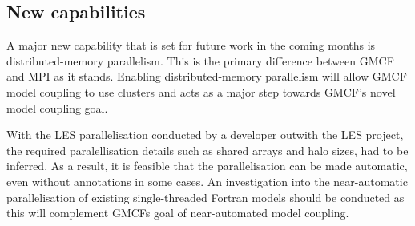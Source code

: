 \subsection{New capabilities}

A major new capability that is set for future work in the coming months is
distributed-memory parallelism. This is the primary difference between GMCF and
MPI as it stands. Enabling distributed-memory parallelism will allow GMCF model
coupling to use clusters and acts as a major step towards GMCF's novel model
coupling goal.

With the LES parallelisation conducted by a developer outwith the LES project,
the required paralellisation details such as shared arrays and halo sizes, had
to be inferred. As a result, it is feasible that the parallelisation can be made
automatic, even without annotations in some cases. An investigation into the
near-automatic parallelisation of existing single-threaded Fortran models should
be conducted as this will complement GMCFs goal of near-automated model
coupling.
